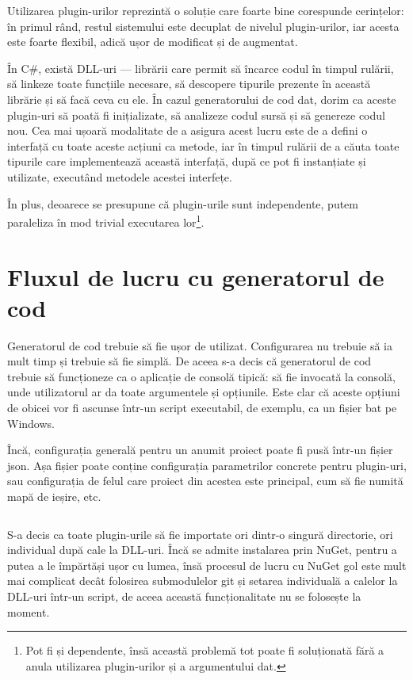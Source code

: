 \documentclass[a4paper,12pt]{report}
\begin{document}
Utilizarea plugin-urilor reprezintă o soluție care foarte bine corespunde cerințelor: în primul rând, restul sistemului este decuplat de nivelul plugin-urilor, iar acesta este foarte flexibil, adică ușor de modificat și de augmentat.

În C\#, există \ac{DLL}-uri --- librării care permit să încarce codul în timpul rulării, să linkeze toate funcțiile necesare, să descopere tipurile prezente în această librărie și să facă ceva cu ele.
În cazul generatorului de cod dat, dorim ca aceste plugin-uri să poată fi inițializate, să analizeze codul sursă și să genereze codul nou.
Cea mai ușoară modalitate de a asigura acest lucru este de a defini o interfață cu toate aceste acțiuni ca metode, iar în timpul rulării de a căuta toate tipurile care implementează această interfață, după ce pot fi instanțiate și utilizate, executând metodele acestei interfețe.

În plus, deoarece se presupune că plugin-urile sunt independente, putem paraleliza în mod trivial executarea lor\footnote{Pot fi și dependente, însă această problemă tot poate fi soluționată fără a anula utilizarea plugin-urilor și a argumentului dat.}.

\section{Fluxul de lucru cu generatorul de cod}

Generatorul de cod trebuie să fie ușor de utilizat.
Configurarea nu trebuie să ia mult timp și trebuie să fie simplă.
De aceea s-a decis că generatorul de cod trebuie să funcționeze ca o aplicație de consolă tipică: să fie invocată la consolă, unde utilizatorul ar da toate argumentele și opțiunile.
Este clar că aceste opțiuni de obicei vor fi ascunse într-un script executabil, de exemplu, ca un fișier bat pe Windows.

Încă, configurația generală pentru un anumit proiect poate fi pusă într-un fișier json.
Așa fișier poate conține configurația parametrilor concrete pentru plugin-uri, sau configurația de felul care proiect din acestea este principal, cum să fie numită mapă de ieșire, etc.
\inputminted{js}{../race/game/kari.json}


S-a decis ca toate plugin-urile să fie importate ori dintr-o singură directorie, ori individual după cale la \ac{DLL}-uri.
Încă se admite instalarea prin NuGet, pentru a putea a le împărtăși ușor cu lumea, însă procesul de lucru cu NuGet gol este mult mai complicat decât folosirea submodulelor git și setarea individuală a calelor la \ac{DLL}-uri într-un script, de aceea această funcționalitate nu se folosește la moment.
\end{document}
